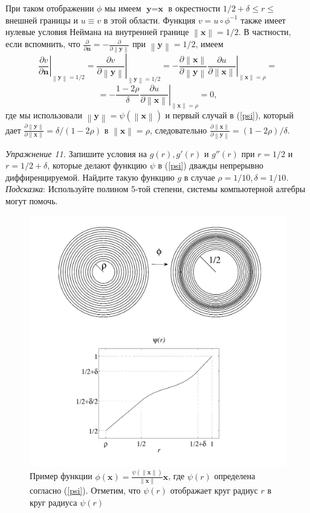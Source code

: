 \documentclass[a4paper, 12pt]{article}
\newcommand{\normb}[1]{\left\lVert\textbf{#1}\right\rVert}
\begin{document}
При таком отображении $\phi$ мы имеем $\textbf{y} = \textbf{x}$ в окрестности
$1/2 + \delta \le r \le$ внешней границы и $u \equiv v$ в этой области. Функция 
$v = u\circ \phi^{-1}$ также имеет нулевые условия Неймана на внутренней границе 
$\normb{x} = 1/2$. В частности, если вспомнить, что $\frac{\partial
}{\partial \textbf{n}} = - \frac{\partial}{\partial \normb{y}}$
при $\normb{y} = 1/2$, имеем
\begin{equation*}
\left.\frac{\partial v}{\partial \textbf{n}}\right|_{\normb{y}=1/2} = 
\left.\frac{\partial v}{\partial \normb{y}}\right|_{\normb{y}=1/2} =
-\frac{\partial \normb{x}}{\partial \normb{y}} 
\left.\frac{\partial u}{\partial \normb{x}}\right|_{\normb{x}=\rho} =
\end{equation*}  
\begin{equation*}
= -\frac{1-2\rho}{\delta} \left.\frac{\partial u}{\partial \normb{x}}
\right|_{\normb{x}=\rho} = 0,
\end{equation*}
где мы использовали $\normb{y} =\psi(\normb{x})$ и первый случай в
(\ref{psi}), который дает $\frac{\partial \normb{y}}
{\partial \normb{x}}=\delta/(1-2\rho)$ в $\normb{x} = \rho$,
следовательно $\frac{\partial \normb{x}}{\partial\normb{y}}
=(1-2\rho)/\delta$.

\textit{Упражнение 11.} Запишите условия на $g(r), g'(r)$ и $g''(r)$ при $r = 1/2$ и
$r =  1/2+ \delta$, которые делают функцию $\psi$ в (\ref{psi}) дважды 
непрерывно диффиренцируемой. Найдите такую функцию $g$ в случае $\rho = 1/10, 
\delta=1/10$. \textit{Подсказка}: Используйте полином 5-той степени, системы 
компьютерной алгебры могут помочь.
\begin{figure}[t]
  \centering
  \includegraphics[height=0.17\paperheight, width=0.35\paperwidth]{4.png}
  \caption{Пример функции $\phi(\textbf{x}) =
  \frac{\psi(\normb{x})}{\normb{x}}\textbf{x}$, где $\psi(r)$
  определена согласно (\ref{psi}). Отметим, что $\psi(r)$ отображает круг радиус
  $r$ в круг радиуса $\psi(r)$}
  \label{fig:4}
\end{figure}
\end{document}
